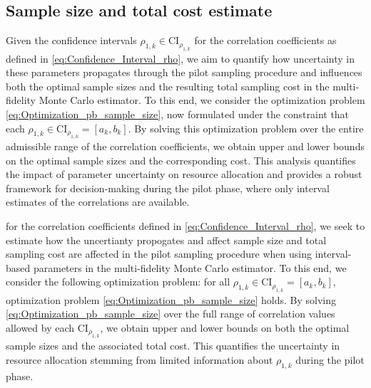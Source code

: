 \subsection{Sample size and total cost estimate}
Given the confidence intervals $\rho_{1,k} \in \text{CI}_{\rho_{1,k}}$ for the correlation coefficients as defined in \eqref{eq:Confidence_Interval_rho}, we aim to quantify how uncertainty in these parameters propagates through the pilot sampling procedure and influences both the optimal sample sizes and the resulting total sampling cost in the multi-fidelity Monte Carlo estimator. To this end, we consider the optimization problem \eqref{eq:Optimization_pb_sample_size}, now formulated under the constraint that each $\rho_{1,k} \in \text{CI}_{\rho_{1,k}}=[a_k, b_k]$. By solving this optimization problem over the entire admissible range of the correlation coefficients, we obtain upper and lower bounds on the optimal sample sizes and the corresponding cost. This analysis quantifies the impact of parameter uncertainty on resource allocation and provides a robust framework for decision-making during the pilot phase, where only interval estimates of the correlations are available.



for the correlation coefficients defined in \eqref{eq:Confidence_Interval_rho}, we seek to estimate how the uncertianty propogates and affect sample size and total sampling cost are affected in the pilot sampling procedure when using interval-based parameters in the multi-fidelity Monte Carlo estimator. To this end, we consider the following optimization problem: for all $\rho_{1,k} \in \text{CI}_{\rho_{1,k}}=[a_k, b_k]$, optimization problem \eqref{eq:Optimization_pb_sample_size} holds. By solving \eqref{eq:Optimization_pb_sample_size} over the full range of correlation values allowed by each $\text{CI}_{\rho_{1,k}}$, we obtain upper and lower bounds on both the optimal sample sizes and the associated total cost. This quantifies the uncertainty in resource allocation stemming from limited information about $\rho_{1,k}$ during the pilot phase.

